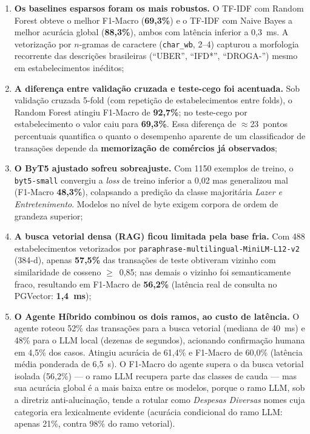 \begin{enumerate}
	\item \textbf{Os baselines esparsos foram os mais robustos.} O TF-IDF com Random Forest
	obteve o melhor F1-Macro (\textbf{69,3\%}) e o TF-IDF com Naive
	Bayes a melhor acurácia global (\textbf{88,3\%}), ambos com
	latência inferior a 0,3~ms. A vetorização por $n$-gramas de caractere (\texttt{char\_wb},
	2--4) capturou a morfologia recorrente das descrições brasileiras (``UBER'', ``IFD*'',
	``DROGA-'') mesmo em estabelecimentos inéditos;

	\item \textbf{A diferença entre validação cruzada e teste-cego foi acentuada.} Sob
	validação cruzada 5-fold (com repetição de estabelecimentos entre folds), o Random Forest
	atingiu F1-Macro de \textbf{92,7\%}; no teste-cego por estabelecimento o
	valor caiu para \textbf{69,3\%}. Essa diferença de
	$\approx$23~pontos percentuais quantifica o quanto o desempenho aparente de um
	classificador de transações depende da \textbf{memorização de comércios já observados};

	\item \textbf{O ByT5 ajustado sofreu sobreajuste.} Com 1150 exemplos de treino, o
	\texttt{byt5-small} convergiu a \textit{loss} de treino inferior a 0,02 mas
	generalizou mal (F1-Macro \textbf{48,3\%}), colapsando a predição
	da classe majoritária \textit{Lazer e Entretenimento}. Modelos no nível de byte exigem
	corpora de ordem de grandeza superior;

	\item \textbf{A busca vetorial densa (RAG) ficou limitada pela base fria.} Com
	488 estabelecimentos vetorizados por
	\texttt{paraphrase-multilingual-MiniLM-L12-v2} (384-d), apenas
	\textbf{57,5\%} das transações de teste
	obtiveram vizinho com similaridade de cosseno $\ge$~0,85; nas demais o vizinho foi
	semanticamente fraco, resultando em F1-Macro de \textbf{56,2\%}
	(latência real de consulta no PGVector: \textbf{1,4~ms});

	\item \textbf{O Agente Híbrido combinou os dois ramos, ao custo de latência.} O agente roteou 52\% das transações para a busca vetorial (mediana de 40~ms) e 48\% para o LLM local (dezenas de segundos), acionando confirmação humana em 4,5\% dos casos. Atingiu acurácia de 61,4\% e F1-Macro de 60,0\% (latência média ponderada de 6,5~s). O F1-Macro do agente supera o da busca vetorial isolada (56,2\%) --- o ramo LLM recupera parte das classes de cauda --- mas sua acurácia global é a mais baixa entre os modelos, porque o ramo LLM, sob a diretriz anti-alucinação, tende a rotular como \textit{Despesas Diversas} nomes cuja categoria era lexicalmente evidente (acurácia condicional do ramo LLM: apenas 21\%, contra 98\% do ramo vetorial).
\end{enumerate}

